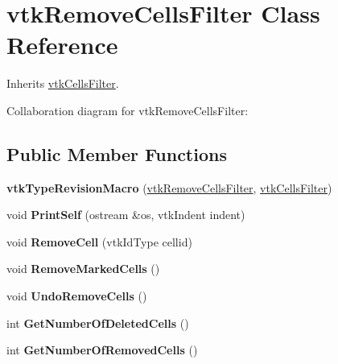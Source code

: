 \hypertarget{classvtkRemoveCellsFilter}{
\section{vtkRemoveCellsFilter Class Reference}
\label{classvtkRemoveCellsFilter}
}


Inherits \hyperlink{classvtkCellsFilter}{vtkCellsFilter}.



Collaboration diagram for vtkRemoveCellsFilter:\subsection*{Public Member Functions}
\begin{DoxyCompactItemize}
\item 
\hypertarget{classvtkRemoveCellsFilter_a0f6ba71b8249357035033b119669ed3b}{
{\bfseries vtkTypeRevisionMacro} (\hyperlink{classvtkRemoveCellsFilter}{vtkRemoveCellsFilter}, \hyperlink{classvtkCellsFilter}{vtkCellsFilter})}
\label{classvtkRemoveCellsFilter_a0f6ba71b8249357035033b119669ed3b}

\item 
\hypertarget{classvtkRemoveCellsFilter_a21e8ea17142071f5d23b8b0c6dc3d26a}{
void {\bfseries PrintSelf} (ostream \&os, vtkIndent indent)}
\label{classvtkRemoveCellsFilter_a21e8ea17142071f5d23b8b0c6dc3d26a}

\item 
\hypertarget{classvtkRemoveCellsFilter_a3e105626c776e7f2663376d2cca201be}{
void {\bfseries RemoveCell} (vtkIdType cellid)}
\label{classvtkRemoveCellsFilter_a3e105626c776e7f2663376d2cca201be}

\item 
\hypertarget{classvtkRemoveCellsFilter_a258e1b946220dce9441d6347f1d480da}{
void {\bfseries RemoveMarkedCells} ()}
\label{classvtkRemoveCellsFilter_a258e1b946220dce9441d6347f1d480da}

\item 
\hypertarget{classvtkRemoveCellsFilter_ad8266a9585708cf16bded72da44052b6}{
void {\bfseries UndoRemoveCells} ()}
\label{classvtkRemoveCellsFilter_ad8266a9585708cf16bded72da44052b6}

\item 
\hypertarget{classvtkRemoveCellsFilter_a10f7f20e8c810446196271a661f11a34}{
int {\bfseries GetNumberOfDeletedCells} ()}
\label{classvtkRemoveCellsFilter_a10f7f20e8c810446196271a661f11a34}

\item 
\hypertarget{classvtkRemoveCellsFilter_a094a871b3da43b6037ac1ae3768067e0}{
int {\bfseries GetNumberOfRemovedCells} ()}
\label{classvtkRemoveCellsFilter_a094a871b3da43b6037ac1ae3768067e0}

\end{DoxyCompactItemize}
